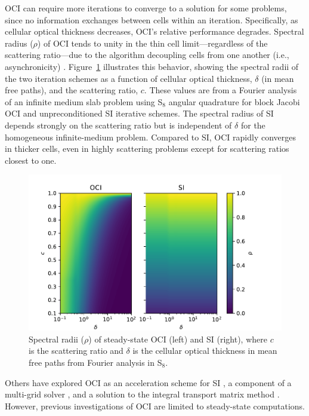 OCI can require more iterations to converge to a solution for some problems, since no information exchanges between cells within an iteration.
Specifically, as cellular optical thickness decreases, OCI's relative performance degrades. %
Spectral radius ($\rho$) of OCI tends to unity in the thin cell limit---regardless of the scattering ratio---due to the algorithm decoupling cells from one another (i.e., asynchronicity) \cite{rosa_cellwise_2013, hoagland_hybrid_2021, man1994parallel}. 
Figure~\ref{fig:c2_ss-sepcrad} illustrates this behavior, showing the spectral radii of the two iteration schemes as a function of cellular optical thickness, $\delta$ (in mean free paths), and the scattering ratio, $c$.
These values are from a Fourier analysis of an infinite medium slab problem using S$_{8}$ angular quadrature for block Jacobi OCI and unpreconditioned SI iterative schemes.
The spectral radius of SI depends strongly on the scattering ratio but is independent of $\delta$ for the homogeneous infinite-medium problem. 
Compared to SI, OCI rapidly converges in thicker cells, even in highly scattering problems except for scattering ratios closest to one.

\begin{figure}[htbp]
    \centering
    \includegraphics[width=\textwidth]{figures/therefore_figs/ss_specrads.pdf}
    \caption{Spectral radii (${\rho}$) of steady-state OCI (left) and SI (right), where $c$ is the scattering ratio and ${\delta}$ is the cellular optical thickness in mean free paths from Fourier analysis in S$_8$.}
    \label{fig:c2_ss-sepcrad}
\end{figure}

Others have explored OCI as an acceleration scheme for SI \cite{hoagland_hybrid_2021}, a component of a multi-grid solver \cite{man1995multigrid1, man1996multigrid2}, and a solution to the integral transport matrix method \cite{raffi2108pidotscom}.
However, previous investigations of OCI are limited to steady-state computations.

